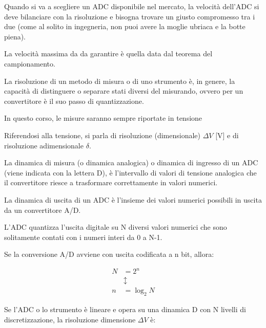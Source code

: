 Quando si va a scegliere un ADC disponibile nel mercato, la velocità dell'ADC si deve bilanciare con la risoluzione e bisogna trovare un giusto compromesso tra i due 
(come al solito in ingegneria, non puoi avere la moglie ubriaca e la botte piena). \newline 

La velocità massima da da garantire è quella data dal teorema del campionamento. \newline 

La risoluzione di un metodo di misura o di uno strumento è, in genere, la capacità di distinguere o separare stati diversi del misurando, ovvero per un convertitore è il suo passo di quantizzazione. \newline 

\begin{tcolorbox}
In questo corso, le misure saranno sempre riportate in tensione    
\end{tcolorbox}

Riferendosi alla tensione, si parla di risoluzione (dimensionale) $\Delta V$ [V] e di risoluzione adimensionale $\delta$. \newline 

La dinamica di misura (o dinamica analogica) o dinamica di ingresso di un ADC (viene indicata con la lettera D), 
è l'intervallo di valori di tensione analogica che il convertitore riesce a trasformare correttamente in valori numerici. \newline 

La dinamica di uscita di un ADC è l'insieme dei valori numerici possibili in uscita da un convertitore A/D. \newline 

L'ADC quantizza l'uscita digitale su N diversi valori numerici che sono solitamente contati con i numeri interi da 0 a N-1. \newline 

Se la conversione A/D avviene con uscita codificata a n bit, allora: 

{
    \Large 
    \begin{equation}
        \begin{split}
        N &= 2^{n} 
        \\
        &\updownarrow
        \\
        n &= \log_{2}N
        \end{split}
    \end{equation}
}

Se l'ADC o lo strumento è lineare e opera su una dinamica D con N livelli di discretizzazione, la risoluzione dimensione $\Delta V$ è: 


